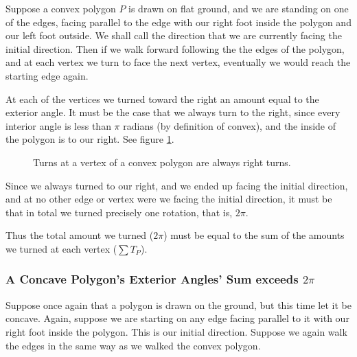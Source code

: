 \documentclass{article}
\begin{document}
Suppose a convex polygon \(P\) is drawn on flat ground, and we are standing on one of the edges, facing parallel to the edge with our right foot inside the polygon and our left foot outside. We shall call the direction that we are currently facing the initial direction. Then if we walk forward following the the edges of the polygon, and at each vertex we turn to face the next vertex, eventually we would reach the starting edge again.

At each of the vertices we turned toward the right an amount equal to the exterior angle. It must be the case that we always turn to the right, since every interior angle is less than \(\pi\) radians (by definition of convex), and the inside of the polygon is to our right. See figure \ref{walk-1}.

\begin{figure}[htbp]
	\centering
	\caption{Turns at a vertex of a convex polygon are always right turns.}
	\label{walk-1}
\end{figure}

Since we always turned to our right, and we ended up facing the initial direction, and at no other edge or vertex were we facing the initial direction, it must be that in total we turned precisely one rotation, that is, \(2\pi\).

Thus the total amount we turned (\(2\pi\)) must be equal to the sum of the amounts we turned at each vertex (\(\sum T_P\)).


\subsubsection{A Concave Polygon's Exterior Angles' Sum exceeds \(2\pi\)}

Suppose once again that a polygon is drawn on the ground, but this time let it be concave. Again, suppose we are starting on any edge facing parallel to it with our right foot inside the polygon. This is our initial direction. Suppose we again walk the edges in the same way as we walked the convex polygon.
\end{document}
